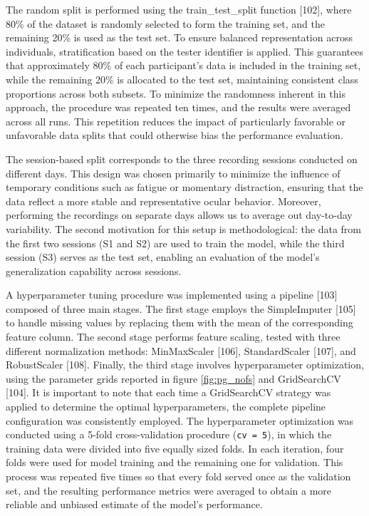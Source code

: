 \documentclass{article}
\begin{document}
The random split is performed using the train\_test\_split function [102], where 80\% of the dataset is randomly selected to form the training set, and the remaining 20\% is used as the test set.
To ensure balanced representation across individuals, stratification based on the tester identifier is applied.
This guarantees that approximately 80\% of each participant's data is included in the training set, while the remaining 20\% is allocated to the test set, maintaining consistent class proportions across both subsets.
To minimize the randomness inherent in this approach, the procedure was repeated ten times, and the results were averaged across all runs.
This repetition reduces the impact of particularly favorable or unfavorable data splits that could otherwise bias the performance evaluation.

The session-based split corresponds to the three recording sessions conducted on different days. 
This design was chosen primarily to minimize the influence of temporary conditions such as fatigue or momentary distraction, ensuring that the data reflect a more stable and representative ocular behavior. 
Moreover, performing the recordings on separate days allows us to average out day-to-day variability. 
The second motivation for this setup is methodological: the data from the first two sessions (S1 and S2) are used to train the model, while the third session (S3) serves as the test set, enabling an evaluation of the model's generalization capability across sessions.

A hyperparameter tuning procedure was implemented using a pipeline [103] composed of three main stages.
The first stage employs the SimpleImputer [105] to handle missing values by replacing them with the mean of the corresponding feature column. 
The second stage performs feature scaling, tested with three different normalization methods: MinMaxScaler [106], StandardScaler [107], and RobustScaler [108]. 
Finally, the third stage involves hyperparameter optimization, using the parameter grids reported in figure \ref{fig:pg_nofs} and GridSearchCV [104]. 
It is important to note that each time a GridSearchCV strategy was applied to determine the optimal hyperparameters, the complete pipeline configuration was consistently employed. 
The hyperparameter optimization was conducted using a 5-fold cross-validation procedure (\texttt{cv = 5}), in which the training data were divided into five equally sized folds. 
In each iteration, four folds were used for model training and the remaining one for validation. 
This process was repeated five times so that every fold served once as the validation set, and the resulting performance metrics were averaged to obtain a more reliable and unbiased estimate of the model's performance.
\end{document}
